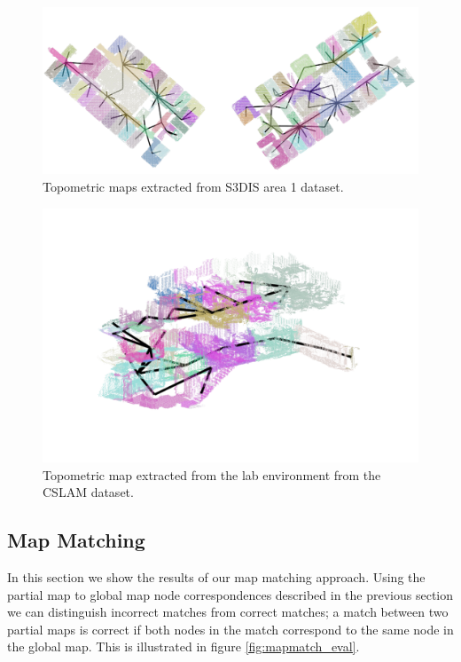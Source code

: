 \begin{figure}[h]
    \centering
    \includegraphics*[width=\textwidth]{./fig/area_1_topo.pdf}
    \caption{Topometric maps extracted from S3DIS area 1 dataset.}
    \label{fig:area_1_topo_01}
\end{figure}

\begin{figure}[h]
    \centering
    \includegraphics*[width=.8\textwidth]{./fig/multi_storey_segmentation.png}
    \caption{Topometric map extracted from the lab environment from the CSLAM dataset.}
    \label{fig:multi_storey_01}
\end{figure}

\subsection{Map Matching}
In this section we show the results of our map matching approach. Using the partial map to global map node correspondences described in the previous section we can distinguish incorrect matches from correct matches; a match between two partial maps is correct if both nodes in the match correspond to the same node in the global map. This is illustrated in figure \ref{fig:mapmatch_eval}.

